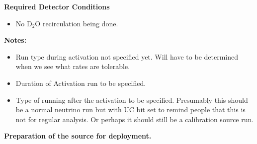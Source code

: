 \noindent
{\bf Required Detector Conditions}
\begin{itemize}
\item No D$_2$O recirculation being done.
\end{itemize}

\noindent
{\bf Notes:}
\begin{itemize}
\item Run type during activation not specified yet.  Will 
  have to be determined  when we see what rates are tolerable.
\item Duration of Activation run to be specified.
\item Type of running after the activation to be specified.  Presumably
  this should be a normal neutrino run but with  UC bit set to
  remind people that this is not for regular analysis.  Or perhaps
  it should still be a calibration source run.
\end{itemize}


\operator

\begin{center}
{\bf Preparation of the source for deployment.}
\end{center}

